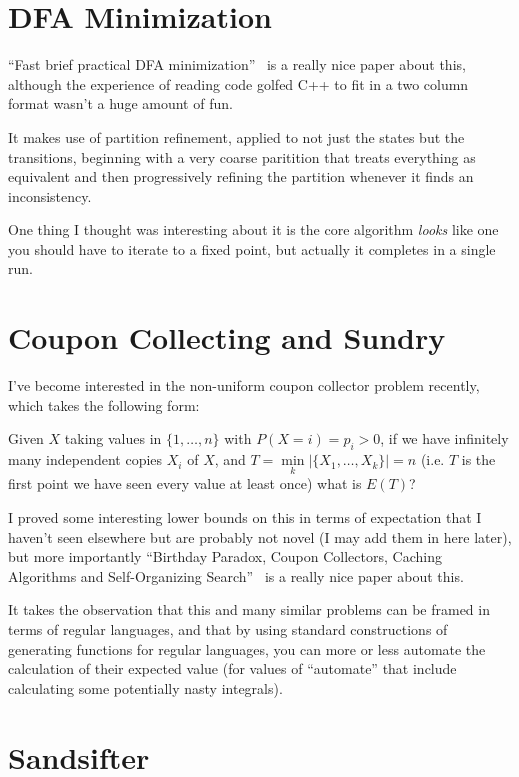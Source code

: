 \documentclass[a4paper]{book}
\begin{document}
\section{DFA Minimization}

``Fast brief practical DFA minimization''~\cite{DBLP:journals/ipl/Valmari12} is a really nice paper about this,
although the experience of reading code golfed C++ to fit in a two column format wasn't a huge amount of fun.

It makes use of partition refinement,
applied to not just the states but the transitions,
beginning with a very coarse paritition that treats everything as equivalent and then progressively refining the partition whenever it finds an inconsistency.

One thing I thought was interesting about it is the core algorithm \emph{looks} like one you should have to iterate to a fixed point,
but actually it completes in a single run.

\section{Coupon Collecting and Sundry}\label{sec:coupons}

I've become interested in the non-uniform coupon collector problem recently,
which takes the following form:

Given \(X\) taking values in \(\{1, \ldots, n\}\) with \(P(X = i) = p_i > 0\),
if we have infinitely many independent copies \(X_i\) of \(X\),
and \(T = \min\limits_k |\{X_1, \ldots, X_k\}| = n\) (i.e. \(T\) is the first point we have seen every value at least once)
what is \(E(T)\)?

I proved some interesting lower bounds on this in terms of expectation that I haven't seen elsewhere but are probably not novel (I may add them in here later),
but more importantly ``Birthday Paradox, Coupon Collectors, Caching Algorithms and Self-Organizing Search''~\cite{DBLP:journals/dam/FlajoletGT92} is a really nice paper about this.

It takes the observation that this and many similar problems can be framed in terms of regular languages,
and that by using standard constructions of generating functions for regular languages,
you can more or less automate the calculation of their expected value (for values of ``automate'' that include calculating some potentially nasty integrals).

\section{Sandsifter}
\end{document}
